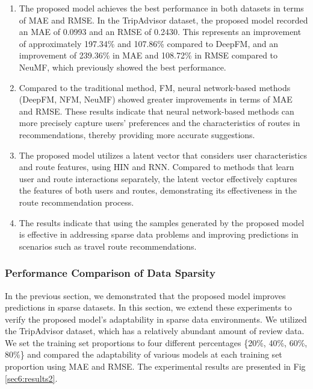 \documentclass[]{article}
\begin{document}
\begin{enumerate}
	\item The proposed model achieves the best performance in both datasets in terms of MAE and RMSE. In the TripAdvisor dataset, the proposed model recorded an MAE of 0.0993 and an RMSE of 0.2430. This represents an improvement of approximately 197.34\% and 107.86\% compared to DeepFM, and an improvement of 239.36\% in MAE and 108.72\% in RMSE compared to NeuMF, which previously showed the best performance.
		
	\item Compared to the traditional method, FM, neural network-based methods (DeepFM, NFM, NeuMF) showed greater improvements in terms of MAE and RMSE. These results indicate that neural network-based methods can more precisely capture users' preferences and the characteristics of routes in recommendations, thereby providing more accurate suggestions.
	
	\item The proposed model utilizes a latent vector that considers user characteristics and route features, using HIN and RNN. Compared to methods that learn user and route interactions separately, the latent vector effectively captures the features of both users and routes, demonstrating its effectiveness in the route recommendation process.
	
	\item The results indicate that using the samples generated by the proposed model is effective in addressing sparse data problems and improving predictions in scenarios such as travel route recommendations.
\end{enumerate}



\subsubsection{Performance Comparison of Data Sparsity}
In the previous section, we demonstrated that the proposed model improves predictions in sparse datasets. In this section, we extend these experiments to verify the proposed model’s adaptability in sparse data environments. We utilized the TripAdvisor dataset, which has a relatively abundant amount of review data. We set the training set proportions to four different percentages \{20\%, 40\%, 60\%, 80\%\} and compared the adaptability of various models at each training set proportion using MAE and RMSE. The experimental results are presented in Fig \ref{sec6:results2}.
\end{document}
